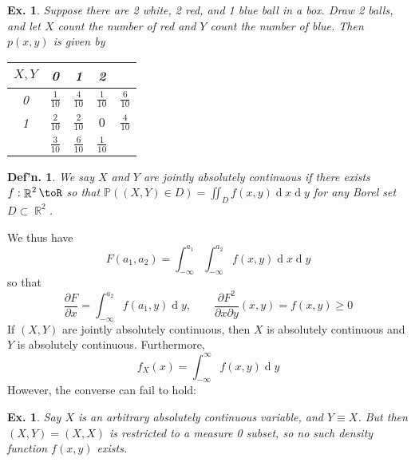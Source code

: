 \documentclass[12pt, a4paper]{book}
\DeclareMathOperator{\R}{\mathbb{R}}
\renewcommand{\Pr}{\mathbb{P}}
\renewcommand{\d}[1]{\ensuremath{\operatorname{d}\!{#1}}} %
\newtheorem{definition}[theorem]{Def'n.}
\newtheorem{example}[theorem]{Ex.}
\theoremstyle{nonumberplain}
\begin{document}
\begin{example}
    Suppose there are 2 white, 2 red, and 1 blue ball in a box.
    Draw 2 balls, and let $X$ count the number of red and $Y$ count the number of blue.
    Then $p(x,y)$ is given by
    \begin{center}
        \begin{tabular}{c|c|c|c|c}
            $X,Y$&0&1&2\\
            \hline
            0&$\frac{1}{10}$&$\frac{4}{10}$&$\frac{1}{10}$&$\frac{6}{10}$\\
            \hline
            1&$\frac{2}{10}$&$\frac{2}{10}$&$0$&$\frac{4}{10}$\\
            \hline
            &$\frac{3}{10}$&$\frac{6}{10}$&$\frac{1}{10}$&
        \end{tabular}
    \end{center}
\end{example}
\begin{definition}
    We say $X$ and $Y$ are jointly absolutely continuous if there exists $f:\R^2\toR$ so that $\Pr((X,Y)\in D)=\iint_D f(x,y)\d{x}\d{y}$ for any Borel set $D\subset\R^2$.
\end{definition}
We thus have
\[F(a_1,a_2)=\int_{-\infty}^{a_1}\int_{-\infty}^{a_2}f(x,y)\d{x}\d{y}\]
so that
\[\frac{\partial F}{\partial x}=\int_{-\infty}^{a_2}f(a_1,y)\d{y},\qquad\frac{\partial F^2}{\partial x\partial y}(x,y)=f(x,y)\geq 0\]
If $(X,Y)$ are jointly absolutely continuous, then $X$ is absolutely continuous and $Y$ is absolutely continuous.
Furthermore,
\[f_X(x)=\int_{-\infty}^\infty f(x,y)\d{y}\]
However, the converse can fail to hold:
\begin{example}
    Say $X$ is an arbitrary absolutely continuous variable, and $Y\equiv X$.
    But then $(X,Y)=(X,X)$ is restricted to a measure 0 subset, so no such density function $f(x,y)$ exists.
\end{example}
\end{document}
